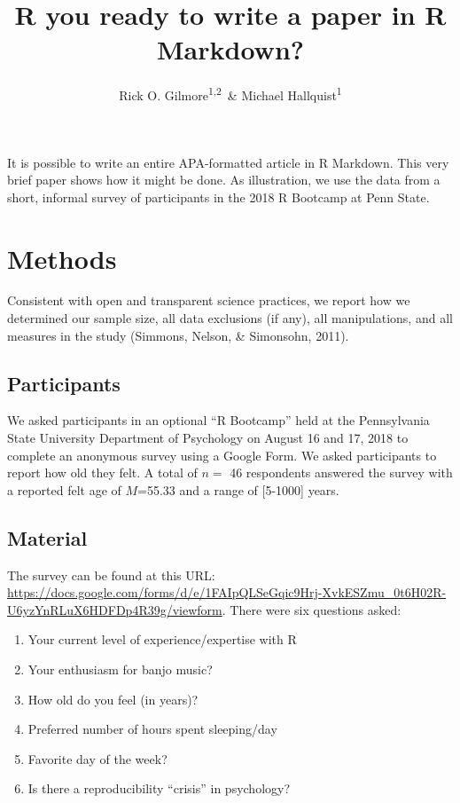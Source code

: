 \documentclass[english,man]{apa6}
\title{R you ready to write a paper in R Markdown?}
\author{Rick O. Gilmore\textsuperscript{1,2}~\& Michael Hallquist\textsuperscript{1}}
\affiliation{
    \vspace{0.5cm}
          \textsuperscript{1} The Pennsylvania State University\\
          \textsuperscript{2} Databrary.org  }
\providecommand{\tightlist}{%
  \setlength{\itemsep}{0pt}\setlength{\parskip}{0pt}}
\theoremstyle{definition}
\theoremstyle{definition}
\theoremstyle{definition}
\theoremstyle{remark}
\begin{document}
\maketitle

\setcounter{secnumdepth}{0}



It is possible to write an entire APA-formatted article in R Markdown.
This very brief paper shows how it might be done. As illustration, we
use the data from a short, informal survey of participants in the 2018 R
Bootcamp at Penn State.

\section{Methods}\label{methods}

Consistent with open and transparent science practices, we report how we
determined our sample size, all data exclusions (if any), all
manipulations, and all measures in the study (Simmons, Nelson, \&
Simonsohn, 2011).

\subsection{Participants}\label{participants}

We asked participants in an optional \enquote{R Bootcamp} held at the
Pennsylvania State University Department of Psychology on August 16 and
17, 2018 to complete an anonymous survey using a Google Form. We asked
participants to report how old they felt. A total of \(n=\) 46
respondents answered the survey with a reported felt age of \(M\)=55.33
and a range of {[}5-1000{]} years.

\subsection{Material}\label{material}

The survey can be found at this URL:
\url{https://docs.google.com/forms/d/e/1FAIpQLSeGqic9Hrj-XvkESZmu_0t6H02R-U6yzYnRLuX6HDFDp4R39g/viewform}.
There were six questions asked:

\begin{enumerate}
\def\labelenumi{\arabic{enumi}.}
\tightlist
\item
  Your current level of experience/expertise with R
\item
  Your enthusiasm for banjo music?
\item
  How old do you feel (in years)?
\item
  Preferred number of hours spent sleeping/day
\item
  Favorite day of the week?
\item
  Is there a reproducibility \enquote{crisis} in psychology?
\end{enumerate}
\end{document}
